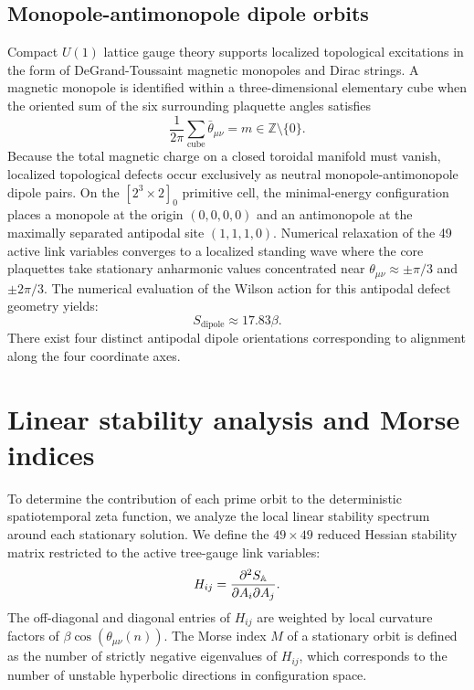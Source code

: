 \documentclass[11pt,a4paper]{article}
\begin{document}
\subsection{Monopole-antimonopole dipole orbits}
Compact $U(1)$ lattice gauge theory supports localized topological excitations in the form of DeGrand-Toussaint magnetic monopoles and Dirac strings. A magnetic monopole is identified within a three-dimensional elementary cube when the oriented sum of the six surrounding plaquette angles satisfies
\begin{equation}
\frac{1}{2\pi} \sum_{\text{cube}} \bar{\theta}_{\mu\nu} = m \in \mathbb{Z} \setminus \{0\}.
\end{equation}
Because the total magnetic charge on a closed toroidal manifold must vanish, localized topological defects occur exclusively as neutral monopole-antimonopole dipole pairs. On the $[2^3 \times 2]_0$ primitive cell, the minimal-energy configuration places a monopole at the origin $(0,0,0,0)$ and an antimonopole at the maximally separated antipodal site $(1,1,1,0)$. Numerical relaxation of the 49 active link variables converges to a localized standing wave where the core plaquettes take stationary anharmonic values concentrated near $\theta_{\mu\nu} \approx \pm \pi/3$ and $\pm 2\pi/3$. The numerical evaluation of the Wilson action for this antipodal defect geometry yields:
\begin{equation}
S_{\text{dipole}} \approx 17.83\beta.
\end{equation}
There exist four distinct antipodal dipole orientations corresponding to alignment along the four coordinate axes.

\section{Linear stability analysis and {Morse} indices}

To determine the contribution of each prime orbit to the deterministic spatiotemporal zeta function, we analyze the local linear stability spectrum around each stationary solution. We define the $49 \times 49$ reduced Hessian stability matrix restricted to the active tree-gauge link variables:
\begin{equation}
H_{ij} = \frac{\partial^2 S_{\mathbb{A}}}{\partial A_i \partial A_j}.
\end{equation}
The off-diagonal and diagonal entries of $H_{ij}$ are weighted by local curvature factors of $\beta \cos(\theta_{\mu\nu}(n))$. The Morse index $M$ of a stationary orbit is defined as the number of strictly negative eigenvalues of $H_{ij}$, which corresponds to the number of unstable hyperbolic directions in configuration space.
\end{document}
